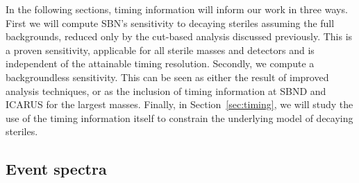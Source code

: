 \documentclass[11pt, a4paper]{article}
\newcommand{\refsec}[1]{Section~\ref{#1}}
\def\muboone{MicroBooNE}
\begin{document}
In the following sections, timing information will inform our work in three
ways. First we will compute SBN's sensitivity to decaying steriles assuming the
full backgrounds, reduced only by the cut-based analysis discussed previously.
This is a proven sensitivity, applicable for all sterile masses and detectors
and is independent of the attainable timing resolution. Secondly, we compute a
backgroundless sensitivity. This can be seen as either the result of improved
analysis techniques, or as the inclusion of timing information at SBND and
ICARUS for the largest masses. Finally, in \refsec{sec:timing}, we will study
the use of the timing information itself to constrain the underlying model of
decaying steriles.

%
%

\subsection{\label{sec:eventspectra}Event spectra}
\end{document}
